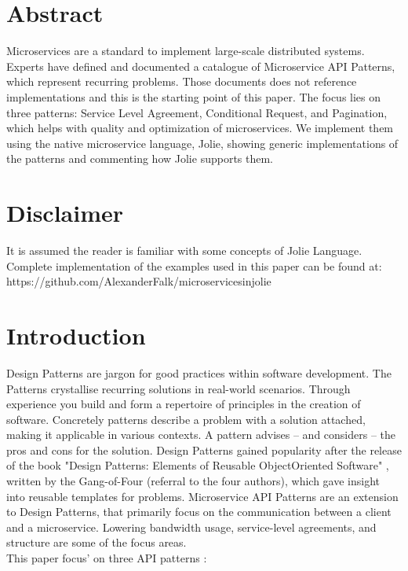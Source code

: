 \documentclass[12pt]{article}
\begin{document}

\tableofcontents
\newpage


\section{Abstract}
Microservices are a standard to implement large-scale distributed systems. Experts have defined and documented a catalogue of Microservice API Patterns, which represent recurring problems. Those documents does not reference implementations and this is the starting point of this paper. The focus lies on three patterns: Service Level Agreement, Conditional Request, and Pagination, which helps with quality and optimization of microservices. We implement them using the native microservice language, Jolie, showing generic implementations of the patterns and commenting how Jolie supports them. 

\section{Disclaimer}
It is assumed the reader is familiar with some concepts of Jolie Language. Complete implementation of the examples used in this paper can be found at:\\
https://github.com/AlexanderFalk/microservicesinjolie

\newpage

\section{Introduction}
Design Patterns are jargon for good practices within software development. The Patterns crystallise recurring solutions in real-world scenarios. Through experience you build and form a repertoire of principles in the creation of software. Concretely patterns \cite{Applying_Patterns} describe a problem with a solution attached, making it applicable in various contexts. A pattern advises -- and considers -- the pros and cons for the solution. Design Patterns gained popularity after the release of the book "Design Patterns: Elements of Reusable Object\-Oriented Software" \cite{DesignPGoF}, written by the Gang-of-Four (referral to the four authors), which gave insight into reusable templates for problems. Microservice API Patterns \cite{MAPIPweb} are an extension to Design Patterns, that primarily focus on the communication between a client and a microservice. Lowering bandwidth usage, service-level agreements, and structure are some of the focus areas. \\
This paper focus' on three API patterns \cite{MAPIPweb}: 
\end{document}
